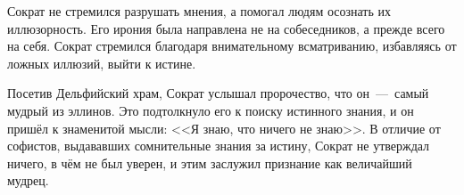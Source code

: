 
Сократ не стремился разрушать мнения, а помогал людям осознать их иллюзорность. Его ирония была направлена не на собеседников, а прежде всего на себя. Сократ стремился благодаря внимательному всматриванию, избавляясь от ложных иллюзий, выйти к истине.

Посетив Дельфийский храм, Сократ услышал пророчество, что он~---~самый мудрый из эллинов. Это подтолкнуло его к поиску истинного знания, и он пришёл к знаменитой мысли: <<Я знаю, что ничего не знаю>>. В отличие от софистов, выдававших сомнительные знания за истину, Сократ не утверждал ничего, в чём не был уверен, и этим заслужил признание как величайший мудрец.

